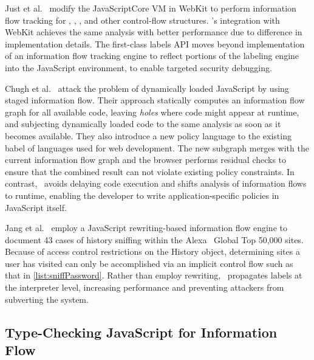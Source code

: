 Just et al.~\cite{just.etal+11} modify the JavaScriptCore VM in WebKit to perform information flow tracking for , , , and other control-flow structures.
\FlowCore's integration with WebKit achieves the same analysis with better performance due to difference in implementation details.
The first-class labels API moves beyond implementation of an information flow tracking engine to reflect portions of the labeling engine into the JavaScript environment, to enable targeted security debugging.

Chugh et al.~\cite{chugh.etal+09} attack the problem of dynamically loaded JavaScript by using staged information flow.
Their approach statically computes an information flow graph for all available code, leaving \textit{holes} where code might appear at runtime, and subjecting dynamically loaded code to the same analysis as soon as it becomes available.
They also introduce a new policy language to the existing babel of languages used for web development.
The new subgraph merges with the current information flow graph and the browser performs residual checks to ensure that the combined result can not violate existing policy constraints.
In contrast, \FlowCore\ avoids delaying code execution and shifts analysis of information flows to runtime, enabling the developer to write application-specific policies in JavaScript itself.

Jang et al.~\cite{jang.etal+10} employ a JavaScript rewriting-based information flow engine to document 43 cases of history sniffing within the Alexa~\cite{alexa} Global Top 50,000 sites.
Because of access control restrictions on the History object, determining sites a user has visited can only be accomplished via an implicit control flow such as that in \autoref{list:sniffPassword}.
Rather than employ rewriting, \FlowCore\ propagates labels at the interpreter level, increasing performance and preventing attackers from subverting the system.

\subsection{Type-Checking JavaScript for Information Flow}

